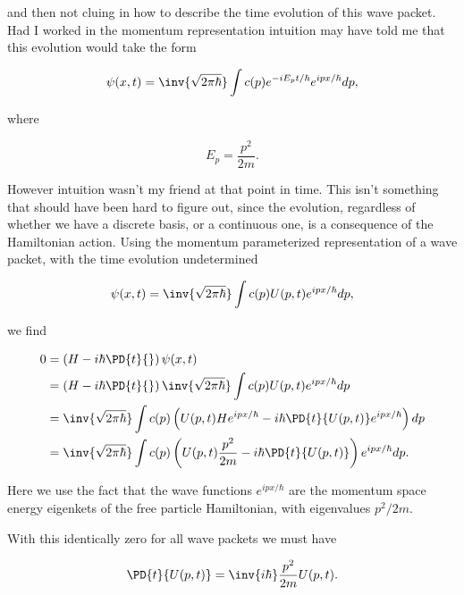 and then not cluing in how to describe the time evolution of this wave packet.  Had I worked in the momentum representation intuition may have told me that this evolution would take the form

\begin{equation}\label{eqn:qmTwoExamReflection:130}
\psi(x, t) = \inv{\sqrt{2 \pi \hbar}} \int c(p) e^{- i E_p t/\hbar} e^{i p x/\hbar} dp,
\end{equation}

where

\begin{equation}\label{eqn:qmTwoExamReflection:150}
E_p = \frac{p^2}{2m}.
\end{equation}

However intuition wasn't my friend at that point in time.  This isn't something that should have been hard to figure out, since the evolution, regardless of whether we have a discrete basis, or a continuous one, is a consequence of the Hamiltonian action.  Using the momentum parameterized representation of a wave packet, with the time evolution undetermined

\begin{equation}\label{eqn:qmTwoExamReflection:170}
\psi(x, t) = \inv{\sqrt{2 \pi \hbar}} \int c(p) U(p, t) e^{i p x/\hbar} dp,
\end{equation}

we find

\begin{align*}
0 &= 
\left(H - i \hbar \PD{t}{}\right) 
\psi(x, t) \\
&=
\left(H - i \hbar \PD{t}{}\right) 
\inv{\sqrt{2 \pi \hbar}} \int c(p) U(p, t) e^{i p x/\hbar} dp \\
&=
\inv{\sqrt{2 \pi \hbar}} \int c(p) \left( 
U(p, t) H e^{i p x/\hbar} 
-i \hbar \PD{t}{U(p, t)} e^{i p x/\hbar} 
\right) dp  \\
&=
\inv{\sqrt{2 \pi \hbar}} \int c(p) \left( 
U(p, t) \frac{p^2}{2m} 
-i \hbar \PD{t}{U(p, t)} 
\right) 
e^{i p x/\hbar} 
dp.
\end{align*}

Here we use the fact that the wave functions $e^{i p x/\hbar}$ are the momentum space energy eigenkets of the free particle Hamiltonian, with eigenvalues $p^2/2m$.

With this identically zero for all wave packets we must have

\begin{equation}\label{eqn:qmTwoExamReflection:190}
\PD{t}{U(p, t)} 
= 
\inv{i \hbar}
\frac{p^2}{2m} 
U(p, t).
\end{equation}

